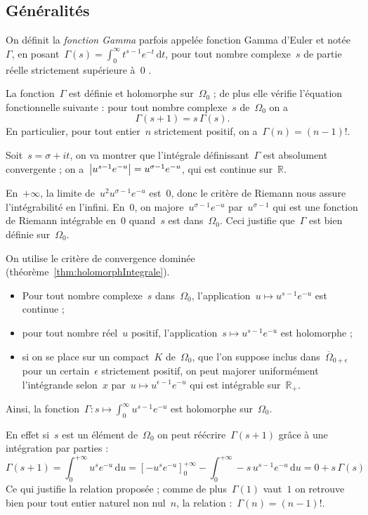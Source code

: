 	\subsection{Généralités}
		\begin{defi}
			On définit la \emph{fonction Gamma} parfois appelée fonction Gamma d'Euler et notée~$\Gamma$, en posant~$\Gamma(s) = \int_{0}^{\infty} t^{s-1} e^{-t} \,\mathrm{d}t$, pour tout nombre complexe~$s$ de partie réelle strictement supérieure à~$0$ .
		\end{defi}
		\begin{prop}\label{prop:gammaDefOmega0}
			La fonction~$\Gamma$ est définie et holomorphe sur~$\Omega_0$ ; de plus elle vérifie l'équation fonctionnelle suivante : pour tout nombre complexe~$s$ de~$\Omega_0$ on a
			\[
				\Gamma(s+1) = s\,\Gamma(s).
			\]
			En particulier, pour tout entier~$n$ strictement positif, on a~$\Gamma(n) = (n-1)!$.
		\end{prop}
		\begin{dem}
			Soit~$s=\sigma+it$, on va montrer que l'intégrale définissant~$\Gamma$ est absolument convergente ; on a~$\left\vert u^{s-1} e^{-u}\right\vert = u^{\sigma-1} e^{-u}$,  qui est continue sur~$\mathbb{R}$.
			
			En~$+\infty$, la limite de~$u^2u^{\sigma-1}e^{-u}$ est~$0$, donc le critère de Riemann nous assure l'intégrabilité en l'infini. En~$0$, on majore~$u^{\sigma-1}e^{-u}$ par~$u^{\sigma-1}$ qui est une fonction de Riemann intégrable en~$0$ quand~$s$ est dans~$\Omega_0$. Ceci justifie que~$\Gamma$ est bien définie sur~$\Omega_0$.
			
			On utilise le critère de convergence dominée (théorème~\ref{thm:holomorphIntegrale}).
			\begin{itemize}
				\item Pour tout nombre complexe~$s$ dans~$\Omega_0$, l'application~$u\mapsto u^{s-1} e^{-u}$ est continue ;
				\item pour tout nombre réel~$u$ positif, l'application~$s\mapsto u^{s-1} e^{-u}$ est holomorphe ;
				\item si on se place sur un compact~$K$ de~$\Omega_0$, que l'on suppose inclus dans~$\overline{\Omega}_{0+\epsilon}$ pour un certain~$\epsilon$ strictement positif, on peut majorer uniformément l'intégrande selon~$x$ par~$u\mapsto u^{\epsilon-1} e^{-u}$ qui est intégrable sur~$\mathbb{R}_+$.
			\end{itemize}
			Ainsi, la fonction~$\Gamma : s\mapsto\int_{0}^{\infty} u^{s-1} e^{-u}$ est holomorphe sur~$\Omega_0$.
			
			 En effet si~$s$ est un élément de~$\Omega_0$ on peut réécrire~$\Gamma(s+1)$ grâce à une intégration par parties :
			\[
				\Gamma(s+1)	  =	\int_{0}^{+\infty} u^{s} e^{-u}\,\mathrm{d}u
							  = \left[ -u^{s}e^{-u} \right]_0^{+\infty} 
							  		\!\!\!\!- \int_{0}^{+\infty} -s\, u^{s-1} e^{-u}\,\mathrm{d}u
							  = 0 + s\,\Gamma(s)
			\]
			Ce qui justifie la relation proposée ; comme de plus~$\Gamma(1)$ vaut~$1$ on retrouve bien pour tout entier naturel non nul~$n$, la relation :~$\Gamma(n) = (n-1)!$.
		\end{dem}
